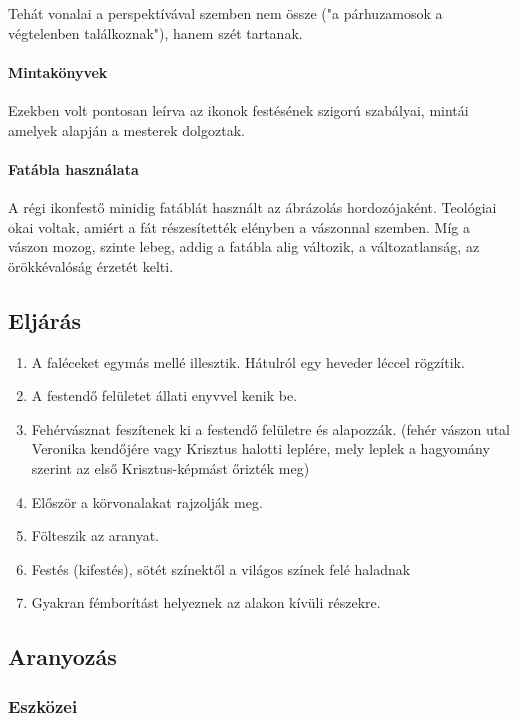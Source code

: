 Tehát vonalai a perspektívával szemben nem össze ("a párhuzamosok a végtelenben találkoznak"), hanem szét tartanak.

\paragraph{Mintakönyvek}

Ezekben volt pontosan leírva az ikonok festésének szigorú szabályai, mintái amelyek alapján a mesterek dolgoztak.

\paragraph{Fatábla használata}
A régi ikonfestő minidig fatáblát használt az ábrázolás hordozójaként. Teológiai okai voltak, amiért a fát részesítették elényben a vászonnal szemben. Míg a vászon mozog, szinte lebeg, addig a fatábla alig változik, a változatlanság, az örökkévalóság érzetét kelti.

\subsection*{Eljárás}
\begin{enumerate}
	\item A faléceket egymás mellé illesztik. Hátulról egy heveder léccel rögzítik.
	\item A festendő felületet állati enyvvel kenik be.
	\item Fehérvásznat feszítenek ki a festendő felületre és alapozzák. (fehér vászon utal Veronika kendőjére vagy Krisztus halotti leplére, mely leplek a hagyomány szerint az első Krisztus-képmást őrizték meg)
	\item Először a körvonalakat rajzolják meg.
	\item Fölteszik az aranyat.
	\item Festés (kifestés), sötét színektől a világos színek felé haladnak
	\item Gyakran fémborítást helyeznek az alakon kívüli részekre.
\end{enumerate}

\subsection*{Aranyozás}

\subsubsection{Eszközei}


